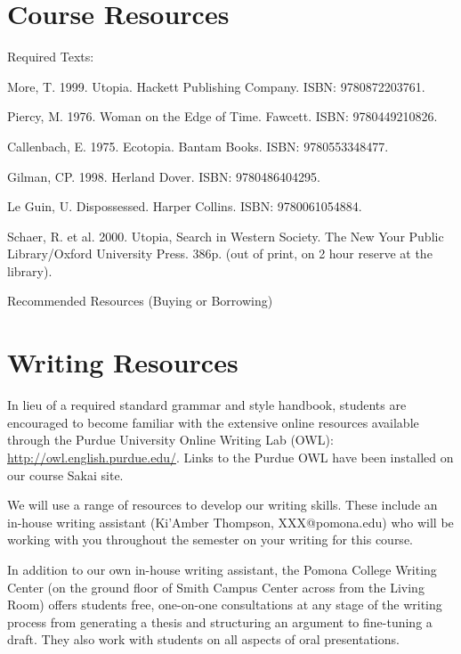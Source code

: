 \section{Course Resources} 

\noindent Required Texts: 
\begin{itemize*}
	\item More, T. 1999. Utopia. Hackett Publishing Company. ISBN: 9780872203761.
	\item Piercy, M. 1976. Woman on the Edge of Time. Fawcett. ISBN: 9780449210826.
  \item Callenbach, E. 1975. Ecotopia. Bantam Books. ISBN: 9780553348477.
  \item Gilman, CP. 1998. Herland Dover. ISBN: 9780486404295.
  \item Le Guin, U.  Dispossessed. Harper Collins. ISBN: 9780061054884.
  \item Schaer, R. et al. 2000. Utopia, Search in Western Society. The New Your Public Library/Oxford University Press. 386p. (out of print, on 2 hour reserve at the library).
\end{itemize*}

\noindent Recommended Resources (Buying or Borrowing)



\section{Writing Resources}

In lieu of a required standard grammar and style handbook, students are encouraged to become familiar with the extensive online resources available through the Purdue University Online Writing Lab (OWL): \url{http://owl.english.purdue.edu/}. Links to the Purdue OWL have been installed on our course Sakai site.

We will use a range of resources to develop our writing skills. These include an in-house writing assistant (Ki'Amber Thompson, XXX@pomona.edu) who will be working with you throughout the semester on your writing for this course. 

In addition to our own in-house writing assistant, the Pomona College Writing Center (on the ground floor of Smith Campus Center across from the Living Room) offers students free, one-on-one consultations at any stage of the writing process from generating a thesis and structuring an argument to fine-tuning a draft. They also work with students on all aspects of oral presentations. 

